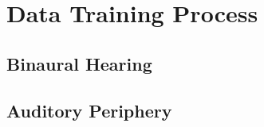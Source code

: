 \documentclass[a4paper]{jpconf}
\begin{document}
%





\section{Data Training Process}
\subsection{Binaural Hearing}

\subsection{Auditory Periphery}
\end{document}
